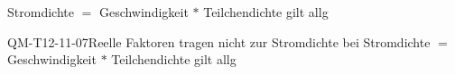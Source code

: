 Stromdichte $=$ Geschwindigkeit $*$ Teilchendichte gilt allg

\begin{REM}{QM-T12-11-07}{Reelle Faktoren tragen nicht zur Stromdichte bei 
Stromdichte $=$ Geschwindigkeit $*$ Teilchendichte gilt allg}
\end{REM}
